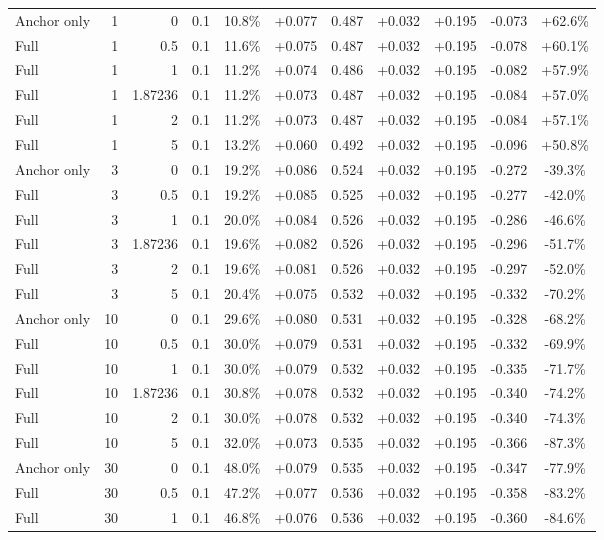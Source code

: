 \begin{table}[htbp]
\begin{tabular}{lrrrccccccc}
Anchor only & 1 & 0 & 0.1 & 10.8\% & +0.077 & 0.487 & +0.032 & +0.195 & -0.073 & +62.6\% \\
Full & 1 & 0.5 & 0.1 & 11.6\% & +0.075 & 0.487 & +0.032 & +0.195 & -0.078 & +60.1\% \\
Full & 1 & 1 & 0.1 & 11.2\% & +0.074 & 0.486 & +0.032 & +0.195 & -0.082 & +57.9\% \\
Full & 1 & 1.87236 & 0.1 & 11.2\% & +0.073 & 0.487 & +0.032 & +0.195 & -0.084 & +57.0\% \\
Full & 1 & 2 & 0.1 & 11.2\% & +0.073 & 0.487 & +0.032 & +0.195 & -0.084 & +57.1\% \\
Full & 1 & 5 & 0.1 & 13.2\% & +0.060 & 0.492 & +0.032 & +0.195 & -0.096 & +50.8\% \\
Anchor only & 3 & 0 & 0.1 & 19.2\% & +0.086 & 0.524 & +0.032 & +0.195 & -0.272 & -39.3\% \\
Full & 3 & 0.5 & 0.1 & 19.2\% & +0.085 & 0.525 & +0.032 & +0.195 & -0.277 & -42.0\% \\
Full & 3 & 1 & 0.1 & 20.0\% & +0.084 & 0.526 & +0.032 & +0.195 & -0.286 & -46.6\% \\
Full & 3 & 1.87236 & 0.1 & 19.6\% & +0.082 & 0.526 & +0.032 & +0.195 & -0.296 & -51.7\% \\
Full & 3 & 2 & 0.1 & 19.6\% & +0.081 & 0.526 & +0.032 & +0.195 & -0.297 & -52.0\% \\
Full & 3 & 5 & 0.1 & 20.4\% & +0.075 & 0.532 & +0.032 & +0.195 & -0.332 & -70.2\% \\
Anchor only & 10 & 0 & 0.1 & 29.6\% & +0.080 & 0.531 & +0.032 & +0.195 & -0.328 & -68.2\% \\
Full & 10 & 0.5 & 0.1 & 30.0\% & +0.079 & 0.531 & +0.032 & +0.195 & -0.332 & -69.9\% \\
Full & 10 & 1 & 0.1 & 30.0\% & +0.079 & 0.532 & +0.032 & +0.195 & -0.335 & -71.7\% \\
Full & 10 & 1.87236 & 0.1 & 30.8\% & +0.078 & 0.532 & +0.032 & +0.195 & -0.340 & -74.2\% \\
Full & 10 & 2 & 0.1 & 30.0\% & +0.078 & 0.532 & +0.032 & +0.195 & -0.340 & -74.3\% \\
Full & 10 & 5 & 0.1 & 32.0\% & +0.073 & 0.535 & +0.032 & +0.195 & -0.366 & -87.3\% \\
Anchor only & 30 & 0 & 0.1 & 48.0\% & +0.079 & 0.535 & +0.032 & +0.195 & -0.347 & -77.9\% \\
Full & 30 & 0.5 & 0.1 & 47.2\% & +0.077 & 0.536 & +0.032 & +0.195 & -0.358 & -83.2\% \\
Full & 30 & 1 & 0.1 & 46.8\% & +0.076 & 0.536 & +0.032 & +0.195 & -0.360 & -84.6\% \\

\end{tabular}
\end{table}

